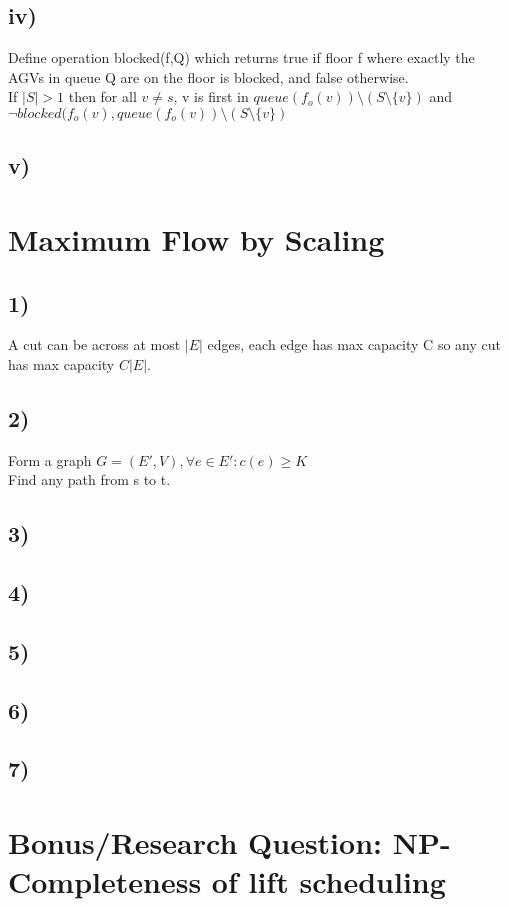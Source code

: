 \documentclass[a4paper]{article}
\begin{document}
\subsection*{iv)}
Define operation blocked(f,Q) which returns true if floor f where exactly the AGVs in queue Q are on the floor is blocked, and false otherwise. \\
If $|S|>1$ then for all $v \neq s$, v is first in $queue(f_o(v))\setminus(S \setminus \{v\})$ and $ \lnot blocked(f_o(v), queue(f_o(v))\setminus(S \setminus \{v\})$
\subsection*{v)}

\section{Maximum Flow by Scaling}
\subsection*{1)}
A cut can be across at most $|E|$ edges, each edge has max capacity C so any cut has max capacity $C|E|$.
\subsection*{2)}
Form a graph $G = (E',V), \forall e\in E': c(e)\geq K$ \\
Find any path from s to t.
\subsection*{3)}
\subsection*{4)}

\subsection*{5)}
\subsection*{6)}
\subsection*{7)}

\section{Bonus/Research Question: NP-Completeness of lift scheduling}
\end{document}
